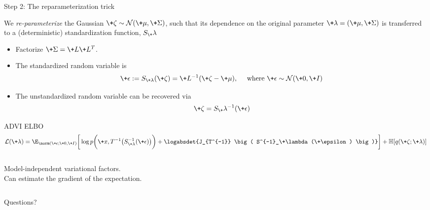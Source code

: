 \documentclass[10pt]{beamer}
\begin{document}
\begin{frame}{Step 2: The reparameterization trick}
	
We \textit{re-parameterize} the Gaussian $\+\zeta \sim \mathcal{N}(\+\mu, \+\Sigma)$, such that its dependence on the original parameter $\+\lambda = (\+\mu, \+\Sigma)$ is transferred to a (deterministic) standardization function, $S_\+\lambda$ 

\begin{itemize}
\item Factorize $\+\Sigma=\+L\+L^T$. 
\item The standardized random variable is 
\[ \+\epsilon := S_{\+\lambda} (\+\zeta) = \+L^{-1} (\+\zeta - \+\mu), \quad \text{ where } \+\epsilon \sim \mathcal{N}(\+0, \+I)\]  
\item The unstandardized random variable can be recovered via
\[ \+\zeta = S_\+\lambda^{-1}(\+\epsilon)\]
\end{itemize}

\begin{block}{\textsc{ADVI ELBO}}
\scriptsize
\[ \mathcal{L}(\+\lambda) = \E_{\norm (\+\epsilon; \+0, \+I)}  \bigg[ 
	\log p \bigg( \+x, T^{-1} \big( S^{-1}_{\+\lambda} (\+\epsilon) \big) \bigg) + \logabsdet{J_{T^{-1}} \big( S^{-1}_\+\lambda (\+\epsilon) \big)}  \bigg]  + \mathbb{H} [q(\+\zeta ; \+\lambda )] \] 
\normalsize
\end{block}

\pause
\vspace{.1in}
\begin{columns}
\small 
\greencheck Model-independent variational factors. \\
\small
\greencheck Can estimate the gradient of the expectation.\\
\end{columns}
	 	
	 	
\end{frame}




\begin{frame}[standout]
  Questions?
\end{frame}



\end{document}
